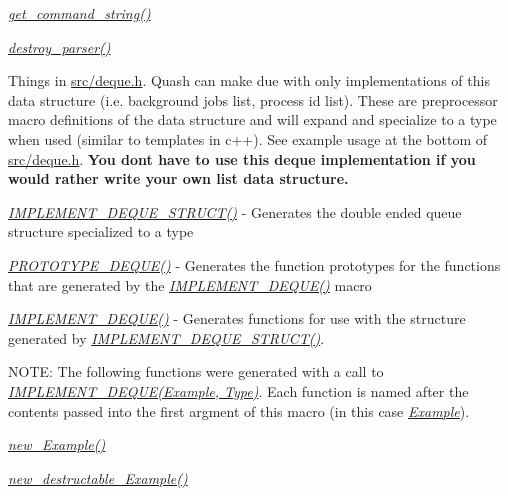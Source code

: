 \begin{DoxyItemize}
\item {\itshape \hyperlink{quash_8c_ab43880685b2507434e4a84f2cb9d54d4}{get\+\_\+command\+\_\+string()}} 
\item {\itshape \hyperlink{parsing__interface_8h_a659361d40550d9776b6ea7fa69a836ce}{destroy\+\_\+parser()}} 
\item Things in \hyperlink{deque_8h}{src/deque.\+h}. Quash can make due with only implementations of this data structure (i.\+e. background jobs list, process id list). These are preprocessor macro definitions of the data structure and will expand and specialize to a type when used (similar to templates in c++). See example usage at the bottom of \hyperlink{deque_8h}{src/deque.\+h}. {\bfseries You don\textquotesingle{}t have to use this deque implementation if you would rather write your own list data structure.}
\begin{DoxyItemize}
\item {\itshape \hyperlink{deque_8h_ad1734634a88d702478c08e26e39dc7b8}{I\+M\+P\+L\+E\+M\+E\+N\+T\+\_\+\+D\+E\+Q\+U\+E\+\_\+\+S\+T\+R\+U\+C\+T()}} -\/ Generates the double ended queue structure specialized to a type
\item {\itshape \hyperlink{deque_8h_a20e8006e6767304fca356f057bc319f4}{P\+R\+O\+T\+O\+T\+Y\+P\+E\+\_\+\+D\+E\+Q\+U\+E()}} -\/ Generates the function prototypes for the functions that are generated by the {\itshape \hyperlink{deque_8h_a283e81072037376be2a17b25b1eb1601}{I\+M\+P\+L\+E\+M\+E\+N\+T\+\_\+\+D\+E\+Q\+U\+E()}} macro
\item {\itshape \hyperlink{deque_8h_a283e81072037376be2a17b25b1eb1601}{I\+M\+P\+L\+E\+M\+E\+N\+T\+\_\+\+D\+E\+Q\+U\+E()}} -\/ Generates functions for use with the structure generated by {\itshape \hyperlink{deque_8h_ad1734634a88d702478c08e26e39dc7b8}{I\+M\+P\+L\+E\+M\+E\+N\+T\+\_\+\+D\+E\+Q\+U\+E\+\_\+\+S\+T\+R\+U\+C\+T()}}.
\begin{DoxyItemize}
\item N\+O\+TE\+: The following functions were generated with a call to {\itshape \hyperlink{deque_8h_a283e81072037376be2a17b25b1eb1601}{I\+M\+P\+L\+E\+M\+E\+N\+T\+\_\+\+D\+E\+Q\+U\+E(\+Example, Type)}}. Each function is named after the contents passed into the first argment of this macro (in this case {\itshape \hyperlink{structExample}{Example}}).
\item {\itshape \hyperlink{deque_8h_ae0c6f52c89e2b087e19e3062186144da}{new\+\_\+\+Example()}} 
\item {\itshape \hyperlink{deque_8h_a4a210705b6f22fe97b7033bb8854a4d6}{new\+\_\+destructable\+\_\+\+Example()}} 

\end{DoxyItemize}
\end{DoxyItemize}
\end{DoxyItemize}
